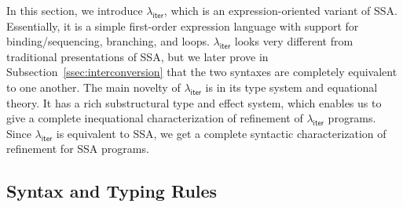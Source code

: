 \documentclass[acmsmall,screen,anonymous,review]{acmart}
\newcommand{\ms}[1]{\ensuremath{\mathsf{#1}}}
\newcommand{\subiterexp}{\texorpdfstring{\(\lambda_{\ms{iter}}\)}{lambda-iter}}
\begin{document}
In this section, we introduce \subiterexp{}, which is an expression-oriented variant of SSA.
Essentially, it is a simple first-order expression language with support for binding/sequencing,
branching, and loops. \subiterexp{} looks very different from traditional presentations of SSA, but
we later prove in Subsection~\ref{ssec:interconversion} that the two syntaxes are completely
equivalent to one another. The main novelty of \subiterexp{} is in its type system and equational theory.
It has a rich substructural type and effect system, which enables us to give a complete inequational
characterization of refinement of \subiterexp{} programs. Since \subiterexp{} is equivalent
to SSA, we get a complete syntactic characterization of refinement for SSA programs. 

% 
% 
\subsection{Syntax and Typing Rules}
\end{document}
